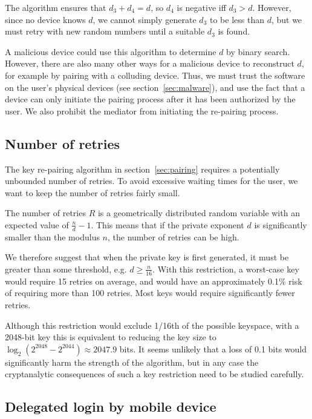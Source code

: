 The algorithm ensures that $d_3 + d_4 = d$, so $d_4$ is negative iff $d_3 > d$. However, since no
device knows $d$, we cannot simply generate $d_3$ to be less than $d$, but we must retry with new
random numbers until a suitable $d_3$ is found.

A malicious device could use this algorithm to determine $d$ by binary search. However, there are
also many other ways for a malicious device to reconstruct $d$, for example by pairing with a
colluding device. Thus, we must trust the software on the user's physical devices (see
section~\ref{sec:malware}), and use the fact that a device can only initiate the pairing process
after it has been authorized by the user. We also prohibit the mediator from initiating the
re-pairing process.

\subsection{Number of retries}\label{sec:retries}

The key re-pairing algorithm in section~\ref{sec:pairing} requires a potentially unbounded
number of retries. To avoid excessive waiting times for the user, we want to keep the number of
retries fairly small.

The number of retries $R$ is a geometrically distributed random variable with an expected value of
$\frac{n}{d}-1$. This means that if the private exponent $d$ is significantly smaller than the
modulus $n$, the number of retries can be high.

We therefore suggest that when the private key is first generated, it must be greater than some
threshold, e.g. $d \ge \frac{n}{16}$. With this restriction, a worst-case key would require 15
retries on average, and would have an approximately 0.1\% risk of requiring more than 100 retries.
Most keys would require significantly fewer retries.

Although this restriction would exclude 1/16th of the possible keyspace, with a 2048-bit key this is
equivalent to reducing the key size to $\log_2(2^{2048} - 2^{2044}) \approx 2047.9$ bits. It seems
unlikely that a loss of 0.1 bits would significantly harm the strength of the algorithm, but in any
case the cryptanalytic consequences of such a key restriction need to be studied carefully.

\subsection{Delegated login by mobile device}\label{sec:delegation}

